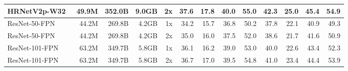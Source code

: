 \documentclass{article}
\begin{document}
\begin{table*}
{\begin{tabular}{lrrrrrrrrrrrr}
        HRNetV2p-W32~\cite{wang2020hrnet}   \hspace{-10pt} &                   49.9M &                352.0B &                9.0GB & \hspace{-6pt}                  2x \hspace{-5pt} & 37.6 &     17.8 &     40.0 &     55.0 & 42.3 &     25.0 &     45.4 &     54.9 \\ \midrule
        ResNet-50-FPN~\cite{wang2020hrnet}  \hspace{-10pt} &                   44.2M &                269.8B &                4.2GB & \hspace{-6pt}                  1x \hspace{-5pt} & 34.2 &     15.7 &     36.8 &     50.2 & 37.8 &     22.1 &     40.9 &     49.3 \\
        ResNet-50-FPN~\cite{wang2020hrnet}  \hspace{-10pt} &                   44.2M &                269.8B &                4.2GB & \hspace{-6pt}                  2x \hspace{-5pt} & 35.0 &     16.0 &     37.5 &     52.0 & 38.6 &     21.7 &     41.6 &     50.9 \\
        ResNet-101-FPN~\cite{wang2020hrnet} \hspace{-10pt} &                   63.2M &                349.7B &                5.8GB & \hspace{-6pt}                  1x \hspace{-5pt} & 36.1 &     16.2 &     39.0 &     53.0 & 40.0 &     22.6 &     43.4 &     52.3 \\
        ResNet-101-FPN~\cite{wang2020hrnet} \hspace{-10pt} &                   63.2M &                349.7B &                5.8GB & \hspace{-6pt}                  2x \hspace{-5pt} & 36.7 &     17.0 &     39.5 &     54.8 & 41.0 &     23.4 &     44.4 &     53.9 \\
        \bottomrule
    \end{tabular}
    }
    \label{tab:cocomrcnn}
\end{table*}
\end{document}

